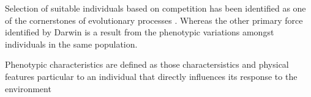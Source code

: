 Selection of suitable individuals based on competition has been identified as one of the cornerstones of evolutionary processes \cite{EibenSmith2003}.
Whereas the other primary force identified by Darwin is a result from the phenotypic variations amongst individuals in the same population.

Phenotypic characteristics are defined as those charactersistics and physical features particular to an individual that directly influences its response to the environment \cite{EibenSmith2003}








